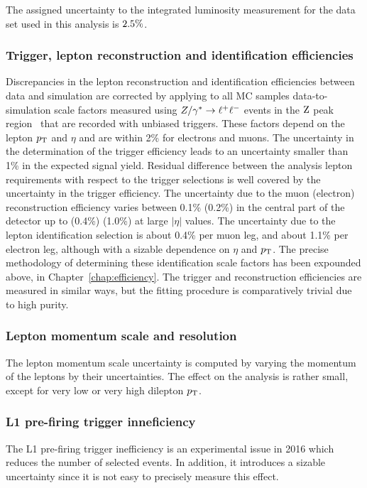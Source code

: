 The assigned uncertainty to the integrated luminosity measurement for
the data set used in this analysis is $2.5\%$.

\subsubsection{Trigger, lepton reconstruction and identification efficiencies}

Discrepancies in the lepton reconstruction and identification
efficiencies between data and simulation are corrected by applying
to all MC samples 
data-to-simulation scale factors measured using $Z/\gamma^*\to\ell^+\ell^-$ events in the $\mathrm{Z}$
peak region~\cite{wzxs} that are recorded with unbiased triggers. These factors
depend on the lepton $p_{\mathrm{T}}$ and $\eta$ and are within 2\% for electrons and muons.
The uncertainty in the determination of the trigger efficiency leads to an uncertainty 
smaller than 1\% in the expected signal yield. Residual difference between the analysis 
lepton requirements with respect to the trigger selections is well covered by 
the uncertainty in the trigger efficiency. The uncertainty due to 
the muon (electron) reconstruction efficiency varies between 0.1\% (0.2\%) in the central 
part of the detector up to (0.4\%) (1.0\%) at large $|\eta|$ values. 
The uncertainty due to the lepton identification selection is about 0.4\% per muon leg, and 
about 1.1\% per electron leg, although with a sizable dependence on $\eta$ and $p_{\mathrm{T}}$.
The precise methodology of determining these identification scale factors has been expounded above,
in Chapter~\ref{chap:efficiency}.
The trigger and reconstruction efficiencies are measured in similar ways,
but the fitting procedure is comparatively trivial due to high purity.

\subsubsection{Lepton momentum scale and resolution}

The lepton momentum scale uncertainty is computed by varying the
momentum of the leptons by their uncertainties. The effect 
on the analysis is rather small, except for very low or very high dilepton 
$p_{\mathrm{T}}$.

\subsubsection{L1 pre-firing trigger inneficiency}
The L1 pre-firing trigger inefficiency is an experimental issue in 2016 which
reduces the number of selected events. In addition, it introduces 
a sizable uncertainty since it is not easy to precisely measure this effect.

